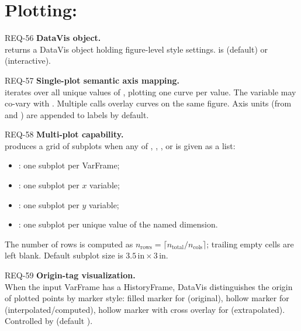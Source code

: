 \section{Plotting: }

\begin{reqbox}{REQ-56}{\stable}
\textbf{DataVis object.}\\
 returns a DataVis object holding
figure-level style settings.  is 
(default) or  (interactive).
\end{reqbox}

\begin{reqbox}{REQ-57}{\stable}
\textbf{Single-plot semantic axis mapping.}\\
 iterates over all unique values of
, plotting one curve per value. The  variable may
co-vary with . Multiple calls overlay curves on the same
figure. Axis units (from  and )
are appended to labels by default.
\end{reqbox}

\begin{reqbox}{REQ-58}{\stable}
\textbf{Multi-plot capability.}\\
 produces a grid of subplots
when any of , , , or  is given as
a list:
\begin{itemize}[noitemsep,topsep=2pt]
  \item {}: one subplot per VarFrame;
  \item {}: one subplot per $x$ variable;
  \item {}: one subplot per $y$ variable;
  \item {}: one subplot per unique value of the
    named dimension.
\end{itemize}
The number of rows is computed as
$n_\text{rows} = \lceil n_\text{total} / n_\text{cols}\rceil$; trailing
empty cells are left blank. Default subplot size is
$3.5\,\text{in} \times 3\,\text{in}$.
\end{reqbox}

\begin{reqbox}{REQ-59}{\stable}
\textbf{Origin-tag visualization.}\\
When the input VarFrame has a HistoryFrame, DataVis distinguishes the
origin of plotted points by marker style: filled marker for 
(original), hollow marker for  (interpolated/computed), hollow
marker with cross overlay for  (extrapolated). Controlled by
 (default ).
\end{reqbox}

